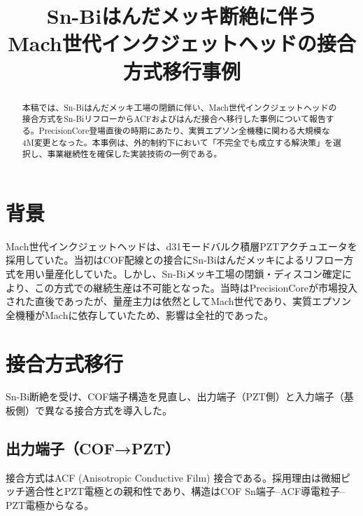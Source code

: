 \documentclass[conference]{IEEEtran}
\begin{document}
\title{Sn-Biはんだメッキ断絶に伴う\\Mach世代インクジェットヘッドの接合方式移行事例}

\author{%
}

\maketitle

\begin{abstract}
本稿では、Sn-Biはんだメッキ工場の閉鎖に伴い、Mach世代インクジェットヘッドの接合方式をSn-BiリフローからACFおよびはんだ接合へ移行した事例について報告する。PrecisionCore登場直後の時期にあたり、実質エプソン全機種に関わる大規模な4M変更となった。本事例は、外的制約下において「不完全でも成立する解決策」を選択し、事業継続性を確保した実装技術の一例である。
\end{abstract}

\section{背景}
Mach世代インクジェットヘッドは、d31モードバルク積層PZTアクチュエータを採用していた。当初はCOF配線との接合にSn-Biはんだメッキによるリフロー方式を用い量産化していた。しかし、Sn-Biメッキ工場の閉鎖・ディスコン確定により、この方式での継続生産は不可能となった。当時はPrecisionCoreが市場投入された直後であったが、量産主力は依然としてMach世代であり、実質エプソン全機種がMachに依存していたため、影響は全社的であった。

\section{接合方式移行}
Sn-Bi断絶を受け、COF端子構造を見直し、出力端子（PZT側）と入力端子（基板側）で異なる接合方式を導入した。

\subsection{出力端子（COF→PZT）}
接合方式はACF (Anisotropic Conductive Film) 接合である。採用理由は微細ピッチ適合性とPZT電極との親和性であり、構造はCOF Sn端子–ACF導電粒子–PZT電極からなる。
\end{document}
